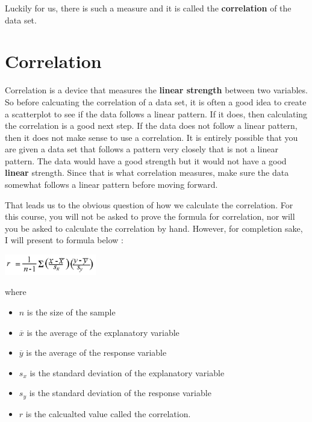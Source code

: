 \documentclass[
  letterpaper,
  DIV=11,
  numbers=noendperiod]{scrreprt}
\providecommand{\tightlist}{%
  \setlength{\itemsep}{0pt}\setlength{\parskip}{0pt}}\usepackage{longtable,booktabs,array}
\begin{document}
Luckily for us, there is such a measure and it is called the
\textbf{correlation} of the data set.

\section*{Correlation}\label{correlation}


Correlation is a device that measures the \textbf{linear strength}
between two variables. So before calcuating the correlation of a data
set, it is often a good idea to create a scatterplot to see if the data
follows a linear pattern. If it does, then calculating the correlation
is a good next step. If the data does not follow a linear pattern, then
it does not make sense to use a correlation. It is entirely possible
that you are given a data set that follows a pattern very closely that
is not a linear pattern. The data would have a good strength but it
would not have a good \textbf{linear} strength. Since that is what
correlation measures, make sure the data somewhat follows a linear
pattern before moving forward.

That leads us to the obvious question of how we calculate the
correlation. For this course, you will not be asked to prove the formula
for correlation, nor will you be asked to calculate the correlation by
hand. However, for completion sake, I will present to formula below :

\includegraphics[width=0.3\textwidth,height=\textheight]{./images/SC_7.jpg}

where

\begin{itemize}
\tightlist
\item
  \(n\) is the size of the sample
\item
  \(\overline{x}\) is the average of the explanatory variable
\item
  \(\overline{y}\) is the average of the response variable
\item
  \(s_x\) is the standard deviation of the explanatory variable
\item
  \(s_y\) is the standard deviation of the response variable
\item
  \(r\) is the calcualted value called the correlation.
\end{itemize}
\end{document}
